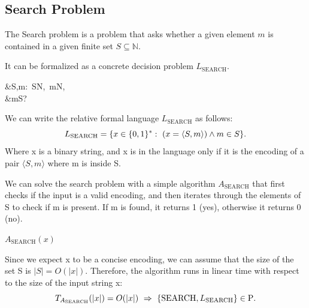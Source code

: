 
\subsection{Search Problem }
The Search problem is a problem that asks whether a given element $m$ is contained in a given finite set $S\subseteq\mathbb N$.

It can be formalized as a concrete decision problem $L_{\mathrm{SEARCH}}$. 
\begin{notesproblem}
&\langle S,m\rangle:\ S\subseteq\mathbb N,\ m\in\mathbb N,\\
&m\in S?
\end{notesproblem}

We can write the relative formal language  $L_{\mathrm{SEARCH}}$ as follows: 
\[
L_{\mathrm{SEARCH}}=\{x\in\{0,1\}^*:\ (x=\langle S,m\rangle)\land m\in S\}.
\]
Where x is a binary string, and x is in the language only if it is the encoding of a pair $\langle S,m\rangle$ where m is inside S. 

We can solve the search problem with a simple algorithm $A_{\mathrm{SEARCH}}$ that first checks if the input is a valid encoding, and then iterates through the elements of S to check if m is present. If m is found, it returns 1 (yes), otherwise it returns 0 (no).
\begin{notesalgorithm}
\textbf{$A_{\mathrm{SEARCH}}(x)$}
\begin{notespseudocode}
\end{notespseudocode}
\end{notesalgorithm}

Since we expect x to be a concise encoding, we can assume that the size of the set S is $|S|=O(|x|)$. Therefore, the algorithm runs in linear time with respect to the size of the input string x:
\[
T_{A_{\mathrm{SEARCH}}}(|x|)=O(|x|)\ \Rightarrow\
\{\mathrm{SEARCH},L_{\mathrm{SEARCH}}\}\in\mathrm{P}.
\]
